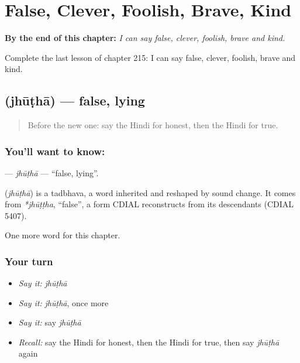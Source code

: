 
\chapter{False, Clever, Foolish, Brave, Kind}
\label{ch:hi-false-clever-foolish-brave-kind}

\begin{chapteropening}
\textbf{By the end of this chapter:} \emph{I can say false, clever, foolish, brave and kind.}

Complete the last lesson of chapter 215: I can say false, clever, foolish, brave and kind.
\end{chapteropening}

\section[\texorpdfstring{\hi{झूठा} (jhūṭhā)}{झूठा (jhūṭhā)}]{ (jhūṭhā) — false, lying}

\label{lesson:HI-C215-jhutha}



\begin{quote}
Before the new one: say the Hindi for honest, then the Hindi for true.
\end{quote}

\subsection*{You'll want to know: }
\textbf{} — \emph{jhūṭhā} — \textquotedblleft{}false, lying\textquotedblright{}.

\begin{cousinweb}
\textbf{} (\emph{jhūṭhā}) is a tadbhava, a word inherited and reshaped by sound change. It comes from \emph{*jhūṭṭha}, \textquotedblleft{}false\textquotedblright{}, a form CDIAL reconstructs from its descendants (CDIAL 5407).
\end{cousinweb}

\begin{grammarlens}[title={What you've built}]
One more word for this chapter.
\end{grammarlens}

\subsection*{Your turn}
\begin{itemize}
\raggedright
  \item \emph{Say it:} \emph{jhūṭhā}
  \item \emph{Say it:} \emph{jhūṭhā}, once more
  \item \emph{Say it:} say \emph{jhūṭhā}
  \item \emph{Recall:} say the Hindi for honest, then the Hindi for true, then say \emph{jhūṭhā} again
\end{itemize}

